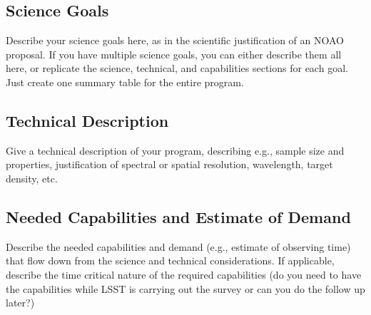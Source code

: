 \subsection{Science Goals}

Describe your science goals here, as in the scientific justification of an NOAO proposal. If you have multiple science goals, you can either describe them all here, or replicate the science, technical, and capabilities sections for each goal. Just create one summary table for the entire program.  

\subsection{Technical Description }

Give a technical description of your program, describing e.g., sample size and properties, justification of spectral or spatial resolution, wavelength, target density, etc.

\subsection{Needed Capabilities and Estimate of Demand}

Describe the needed capabilities and demand (e.g., estimate of observing time) that flow down from the science and technical considerations. If applicable, describe the time critical nature of the required capabilities (do you need to have the capabilities while LSST is carrying out the survey or can you do the follow up later?) 


